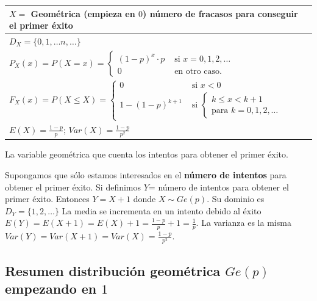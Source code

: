 \documentclass[
  letterpaper,
  DIV=11,
  numbers=noendperiod]{scrreprt}
\begin{document}
\begin{table}
\centering
\begin{tabular}{|l|}
\hline\rowcolor{LightBlue}
$X=$ Geométrica (empieza en $0$) número de fracasos para conseguir el primer éxito
\\\hline
$D_X=\{0,1,\ldots n,\ldots\}$ \\\hline
$P_X(x)=P(X=x)=\left\{\begin{array}{ll}(1-p)^{x}\cdot p & \mbox{ si } x=0,1,2,\ldots \\0 & \mbox{ en otro caso.}\end{array}\right.$\\\hline
$F_X(x)=P(X\leq X)=\left\{\begin{array}{ll} 0 & \mbox{ si } x<0\\
 1- (1-p)^{k+1} & \mbox{ si } \left\{ \begin{array}{l}k\leq x< k+1\\\mbox{para } k=0,1,2,\ldots\end{array}
 \right.\end{array}\right.$ \\\hline
$E(X)=\frac{1-p}{p}$; $Var(X)=\frac{1-p}{p^2}$\\\hline
\end{tabular}
\end{table}

La variable geométrica que cuenta los intentos para obtener el primer
éxito.

Supongamos que sólo estamos interesados en el \textbf{número de
intentos} para obtener el primer éxito. Si definimos \(Y\)= número de
intentos para obtener el primer éxito. Entonces \(Y=X+1\) donde
\(X\sim Ge(p)\). Su dominio es \(D_Y=\{1,2,\ldots\}\) La media se
incrementa en un intento debido al éxito
\(E(Y)=E(X+1)=E(X)+1=\frac{1-p}{p}+1=\frac1{p}\). La varianza es la
misma \(Var(Y)=Var(X+1)=Var(X)=\frac{1-p}{p^2}\).

\subsection{\texorpdfstring{Resumen distribución geométrica \(Ge(p)\)
empezando en
\(1\)}{Resumen distribución geométrica Ge(p) empezando en 1}}\label{resumen-distribuciuxf3n-geomuxe9trica-gep-empezando-en-1}
\end{document}
